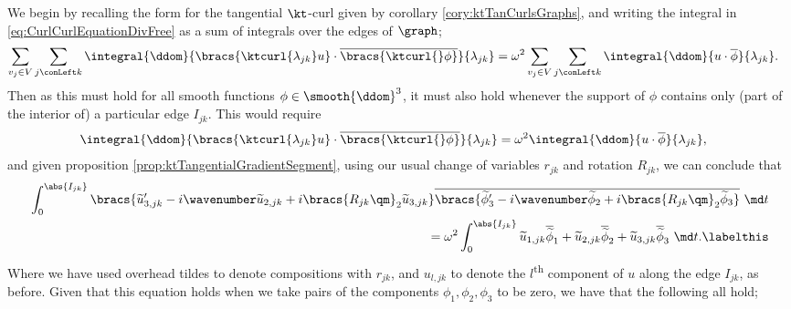 We begin by recalling the form for the tangential $\kt$-curl given by corollary \ref{cory:ktTanCurlsGraphs}, and writing the integral in \eqref{eq:CurlCurlEquationDivFree} as a sum of integrals over the edges of $\graph$;
\begin{align*}
	\sum_{v_j\in V}\sum_{j\conLeft k}\integral{\ddom}{\bracs{\ktcurl{\lambda_{jk}}u}\cdot\overline{\bracs{\ktcurl{}\phi}}}{\lambda_{jk}} 
	&= \omega^2\sum_{v_j\in V}\sum_{j\conLeft k}\integral{\ddom}{u\cdot\overline{\phi}}{\lambda_{jk}}.
\end{align*}
Then as this must hold for all smooth functions $\phi\in\smooth{\ddom}^3$, it must also hold whenever the support of $\phi$ contains only (part of the interior of) a particular edge $I_{jk}$.
This would require
\begin{align*}
	\integral{\ddom}{\bracs{\ktcurl{\lambda_{jk}}u}\cdot\overline{\bracs{\ktcurl{}\phi}}}{\lambda_{jk}} 
	&= \omega^2\integral{\ddom}{u\cdot\overline{\phi}}{\lambda_{jk}},
\end{align*}
and given proposition \ref{prop:ktTangentialGradientSegment}, using our usual change of variables $r_{jk}$ and rotation $R_{jk}$, we can conclude that
\begin{align*}
	\int_0^{\abs{I_{jk}}} \bracs{\widetilde{u}_{3,jk}' - i\wavenumber\widetilde{u}_{2,jk} + i\bracs{R_{jk}\qm}_2\widetilde{u}_{3,jk} } \overline{\bracs{\widetilde{\phi}_3' - i\wavenumber\widetilde{\phi}_2 + i\bracs{R_{jk}\qm}_2\widetilde{\phi}_3 }} \ \md t \\
	= \omega^2 \int_0^{\abs{I_{jk}}} \widetilde{u}_{1,jk}\overline{\widetilde{\phi}}_1 + \widetilde{u}_{2,jk}\overline{\widetilde{\phi}}_2 + \widetilde{u}_{3,jk}\overline{\widetilde{\phi}}_3 \ \md t. \labelthis\label{eq:LongReductionEquation}
\end{align*}
Where we have used overhead tildes to denote compositions with $r_{jk}$, and $u_{l,jk}$ to denote the $l$\textsuperscript{th} component of $u$ along the edge $I_{jk}$, as before.
Given that this equation holds when we take pairs of the components $\phi_1,\phi_2,\phi_3$ to be zero, we have that the following all hold;
